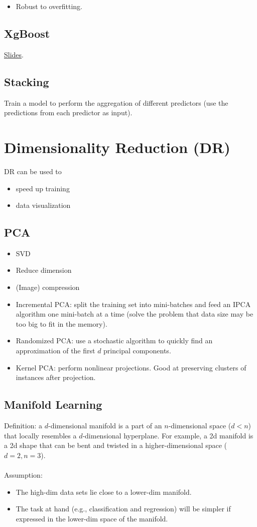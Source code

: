 \documentclass[12pt,oneside,a4paper]{article}
\numberwithin{equation}{section}
\begin{document}
\begin{itemize}
\item Robust to overfitting.
\end{itemize}

\subsection{XgBoost}

\href{https://homes.cs.washington.edu/~tqchen/pdf/BoostedTree.pdf}{Slides}.
\subsection{Stacking}
Train a model to perform the aggregation of different predictors (use the predictions from each predictor as input).
\section{Dimensionality Reduction (DR)}
DR can be used to 
\begin{itemize}
\item speed up training
\item data visualization
\end{itemize}

\subsection{PCA}
\begin{itemize}
\item SVD 
\item Reduce dimension 
\item (Image) compression
\item Incremental PCA: split the training set into mini-batches and feed an IPCA algorithm one mini-batch at a time (solve the problem that data size may be too big to fit in the memory).
\item Randomized PCA: use a stochastic algorithm to quickly find an approximation of the first $d$ principal components. 
\item Kernel PCA: perform nonlinear projections. Good at preserving clusters of instances after projection. 
\end{itemize}
\subsection{Manifold Learning}
Definition: a $d$-dimensional manifold is a part of an $n$-dimensional space ($d < n$) that locally resembles a $d$-dimensional hyperplane. For example, a 2d manifold is a 2d shape that can be bent and twisted in a higher-dimensional space ($d = 2, n = 3$).
\\~\\
Assumption: 
\begin{itemize}
\item The high-dim data sets lie close to a lower-dim manifold. 
\item The task at hand (e.g., classification and regression) will be simpler if expressed in the lower-dim space of the manifold.
\end{itemize}
\end{document}
